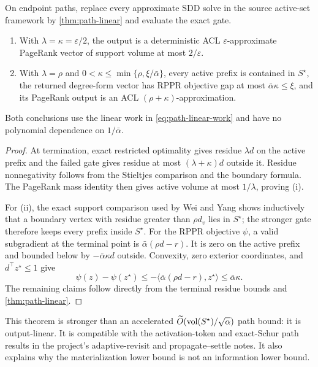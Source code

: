 \documentclass[11pt]{article}
\begin{document}
\begin{corollary}
\label{cor:path-source-guarantees}
On endpoint paths, replace every approximate SDD solve in the source active-set
framework by \cref{thm:path-linear} and evaluate the exact gate.
\begin{enumerate}[label=(\roman*)]
\item With $\lambda=\kappa=\varepsilon/2$, the output is a deterministic ACL
$\varepsilon$-approximate PageRank vector of support volume at most
$2/\varepsilon$.
\item With $\lambda=\rho$ and
$0<\kappa\leq\min\{\rho,\xi/\bar\alpha\}$, every active prefix is contained
in $S^\star$, the returned degree-form vector has RPPR objective gap at most
$\bar\alpha\kappa\leq\xi$, and its PageRank output is an ACL
$(\rho+\kappa)$-approximation.
\end{enumerate}
Both conclusions use the linear work in \cref{eq:path-linear-work} and have
no polynomial dependence on $1/\bar\alpha$.
\end{corollary}

\begin{proof}
At termination, exact restricted optimality gives residue $\lambda d$ on the
active prefix and the failed gate gives residue at most
$(\lambda+\kappa)d$ outside it.  Residue nonnegativity follows from the
Stieltjes comparison and the boundary formula.  The PageRank mass identity
then gives active volume at most $1/\lambda$, proving (i).

For (ii), the exact support comparison used by Wei and Yang shows inductively
that a boundary vertex with residue greater than $\rho d_v$ lies in
$S^\star$; the stronger gate therefore keeps every prefix inside
$S^\star$.  For the RPPR objective $\psi$, a valid subgradient at the terminal
point is $\bar\alpha(\rho d-r)$.  It is zero on the active prefix and bounded
below by $-\bar\alpha\kappa d$ outside.  Convexity, zero exterior coordinates,
and $d^\top z^\star\leq1$ give
\begin{equation}
 \psi(z)-\psi(z^\star)
 \leq -\langle\bar\alpha(\rho d-r),z^\star\rangle
 \leq\bar\alpha\kappa.
\end{equation}
The remaining claims follow directly from the terminal residue bounds and
\cref{thm:path-linear}.
\end{proof}

This theorem is stronger than an accelerated
$\widetilde O(\operatorname{vol}(S^\star)/\sqrt\alpha)$ path bound: it is output-linear.
It is compatible with the activation-token and exact-Schur path results in
the project's adaptive-revisit and propagate--settle notes.  It also explains
why the materialization lower bound is not an information lower bound.
\end{document}
